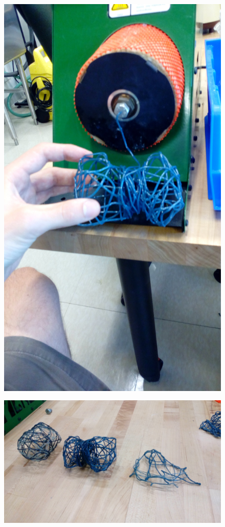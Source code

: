 \begin{figure}[h!]
\centering
\includegraphics[width=0.5\hsize]{art/IMG_20160801_115125.jpg}
\caption{\label{fig:art_1}  }
\end{figure}



\begin{figure}[h!]
\centering
\includegraphics[width=\hsize]{art/IMG_20160801_121232.jpg}
\caption{\label{fig:art_3}  }
\end{figure}

